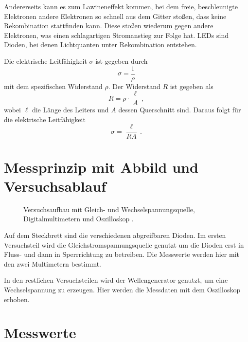 \documentclass[
12pt,
a4paper,
bibliography=totocnumbered, %
BCOR=1cm, %
oneside, %
]{scrartcl}
\newcommand{\lh}{\ell_{\mathrm{H}}}
\begin{document}
Andererseits kann es zum Lawineneffekt kommen, bei dem freie, beschleunigte Elektronen andere Elektronen so schnell aus dem Gitter stoßen, dass keine Rekombination stattfinden kann. Diese stoßen wiederum gegen andere Elektronen, was einen schlagartigen Stromanstieg zur Folge hat.
LEDs sind Dioden, bei denen Lichtquanten unter Rekombination entstehen.

Die elektrische Leitfähigkeit \(\sigma\) ist gegeben durch
\begin{equation}
	\sigma = \frac{1}{\rho}
\end{equation}
mit dem spezifischen Widerstand \(\rho\).
Der Widerstand \(R\) ist gegeben als
\begin{equation}
	R = \rho \cdot \frac{\ell}{A} \,,
\end{equation}
wobei \(\ell\) die Länge des Leiters und \(A\) dessen Querschnitt sind. Daraus folgt für die elektrische Leitfähigkeit
\begin{equation}\label{eq:Leitfähigkeit}
	\sigma = \frac{\ell}{RA} \,.
\end{equation}

\section[Messprinzip]{Messprinzip mit Abbild und Versuchsablauf}

\begin{figure}[H]
	\caption{Versuchsaufbau mit Gleich- und Wechselspannungsquelle, Digitalmultimetern und Oszilloskop \cite{Quelle}.}
	\label{fig:Aufbau}
\end{figure}
Auf dem Steckbrett sind die verschiedenen abgreifbaren Dioden.
Im ersten Versuchsteil wird die Gleichstromspannungsquelle genutzt um die Dioden erst in Fluss- und dann in Sperrrichtung zu betreiben. Die Messwerte werden hier mit den zwei Multimetern bestimmt.

In den restlichen Versuchsteilen wird der Wellengenerator genutzt, um eine Wechselspannung zu erzeugen. Hier werden die Messdaten mit dem Oszilloskop erhoben.


\section{Messwerte}
\end{document}
